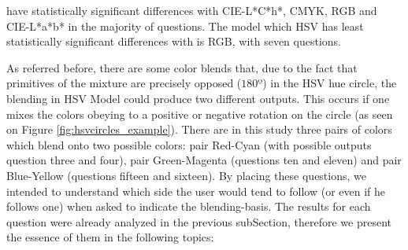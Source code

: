 have statistically significant differences with CIE-L*C*h*, CMYK, RGB and CIE-L*a*b* in the majority of questions. The model which HSV has least statistically significant differences with is RGB, with seven questions. \par
%
As referred before, there are some color blends that, due to the fact that primitives of the mixture are precisely opposed ($180º$) in the HSV hue circle, the blending in HSV Model could produce two different outputs.
This occurs if one mixes the colors obeying to a positive or negative rotation on the circle (as seen on Figure \ref{fig:hsvcircles_example}). There are in this study three pairs of colors which blend onto two possible
colors: pair Red-Cyan (with possible outputs question three and four), pair Green-Magenta (questions ten and eleven) and pair Blue-Yellow (questions fifteen and sixteen). By placing these questions, we intended to
understand which side the user would tend to follow (or even if he follows one) when asked to indicate the blending-basis. The results for each question were already analyzed in the previous subSection, therefore we
present the essence of them in the following topics:
%
